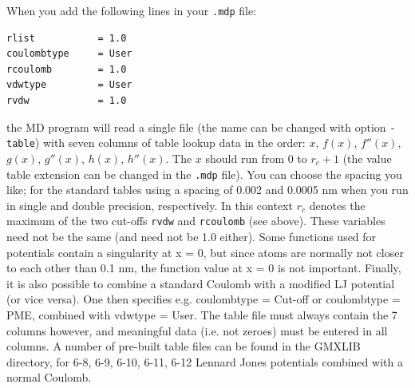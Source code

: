 When you add the following lines in your {\tt .mdp} file:
\begin{verbatim}
rlist           = 1.0
coulombtype     = User
rcoulomb        = 1.0
vdwtype         = User
rvdw            = 1.0
\end{verbatim}
the MD program will read a single file (the name can be changed with
option {\tt -table}) with seven columns of table lookup data in the
order: $x$, $f(x)$, $f''(x)$, $g(x)$, $g''(x)$, $h(x)$, $h''(x)$.
 The $x$ should run from 0 to $r_c+1$ (the value table extension can be
changed in the {\tt .mdp} file).
You can choose the spacing you like; for the standard tables {\gromacs}
using a spacing of 0.002 and 0.0005 nm when you run in single
and double precision, respectively.  In this
context $r_c$ denotes the maximum of the two cut-offs {\tt rvdw} and
{\tt rcoulomb} (see above). These variables need not be the same (and
need not be 1.0 either).  Some functions used for potentials contain a
singularity at x = 0, but since atoms are normally not closer to each
other than 0.1 nm, the function value at x = 0 is not important.
Finally, it is also
possible to combine a standard Coulomb with a modified LJ potential
(or vice versa). One then specifies e.g. coulombtype = Cut-off or
coulombtype = PME, combined with vdwtype = User.  The table file must
always contain the 7 columns however, and meaningful data (i.e. not
zeroes) must be entered in all columns.  A number of pre-built table
files can be found in the GMXLIB directory, for 6-8, 6-9, 6-10, 6-11, 6-12
Lennard Jones potentials combined with a normal Coulomb.


